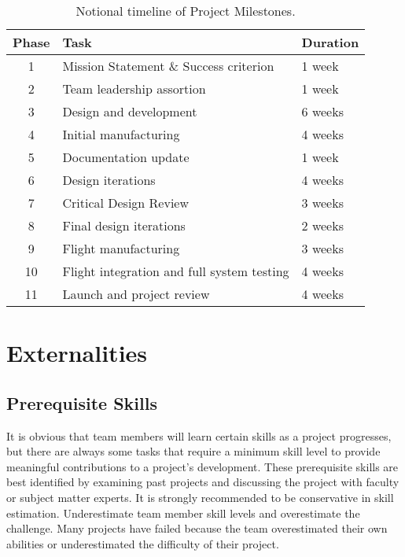 \documentclass[conference]{IEEEtran} %
\begin{document}
\begin{table}[hb!]
    \caption{Notional timeline of Project Milestones.}
    \centering
    \begin{tabular}{@{}cll@{}}
    \toprule
    Phase & Task & Duration \\
    \midrule
    1 & Mission Statement \& Success criterion & 1 week \\
    2 & Team leadership assortion & 1 week \\
    3 & Design and development & 6 weeks \\
    4 & Initial manufacturing & 4 weeks \\
    5 & Documentation update & 1 week \\
    6 & Design iterations & 4 weeks \\
    7 & Critical Design Review & 3 weeks \\
    8 & Final design iterations & 2 weeks \\
    9 & Flight manufacturing & 3 weeks \\
    10 & Flight integration and full system testing & 4 weeks \\
    11 & Launch and project review & 4 weeks \\
    \bottomrule
    \end{tabular}
\label{tab:short-example}
\end{table}

\section{Externalities}
\subsection{Prerequisite Skills}
It is obvious that team members will learn certain skills as a project progresses, but there are always some tasks that require a minimum skill level to provide meaningful contributions to a project's development.
These prerequisite skills are best identified by examining past projects and discussing the project with faculty or subject matter experts.
It is strongly recommended to be conservative in skill estimation.
Underestimate team member skill levels and overestimate the challenge.
Many projects have failed because the team overestimated their own abilities or underestimated the difficulty of their project.
\end{document}
